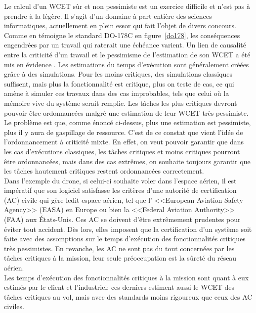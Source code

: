 \documentclass[12pt,a4paper,oneside]{book}
\theoremstyle{break}
\theoremstyle{breakplain}
\begin{document}
Le calcul d'un WCET sûr et non pessimiste est un exercice difficile et n'est pas à prendre à la légère. Il s'agit d'un domaine à part entière des sciences informatiques, actuellement en plein essor qui fait l'objet de divers concours.\\

Comme en témoigne le standard DO-178C en figure~\ref{do178}, les conséquences engendrées par un travail qui raterait une échéance varient. Un lien de causalité entre la criticité d'un travail et le pessimisme de l'estimation de son WCET a été mis en évidence \cite{vestal2007preemptive}. Les estimations du temps d'exécution sont généralement créées grâce à des simulations. Pour les moins critiques, des simulations classiques suffisent, mais plus la fonctionnalité est critique, plus on teste de cas, ce qui amène à simuler ces travaux dans des cas improbables, tels que celui où la mémoire vive du système serait remplie. Les tâches les plus critiques devront pouvoir être ordonnancées malgré une estimation de leur WCET très pessimiste. Le problème est que, comme énoncé ci-dessus, plus une estimation est pessimiste, plus il y aura de gaspillage de ressource. C'est de ce constat que vient l'idée de l'ordonnancement à criticité mixte. En effet, on veut pouvoir garantir que dans les cas d'exécutions classiques, les tâches critiques et moins critiques pourront être ordonnancées, mais dans des cas extrêmes, on souhaite toujours garantir que les tâches hautement critiques restent ordonnancées correctement.\\

Dans l'exemple du drone, si celui-ci souhaite voler dans l'espace aérien, il est impératif que son logiciel satisfasse les critères d'une autorité de certification (AC) civile qui gère ledit espace aérien, tel que l’ <<European Aviation Safety Agency>> (EASA) en Europe ou bien la <<Federal Aviation Authority>> (FAA) aux États-Unis. Ces AC se doivent d'être extrêmement prudentes pour éviter tout accident. Dès lors, elles imposent que la certification d'un système soit faite avec des assomptions sur le temps d'exécution des fonctionnalités critiques très pessimistes. En revanche, les AC ne sont pas du tout concernées par les tâches critiques à la mission, leur seule préoccupation est la sûreté du réseau aérien.\\
Les temps d'exécution des fonctionnalités critiques à la mission sont quant à eux estimés par le client et l'industriel; ces derniers estiment aussi le WCET des tâches critiques au vol, mais avec des standards moins rigoureux que ceux des AC civiles.\\
\end{document}

